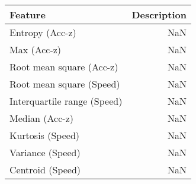 \begin{table}
\centering
\label{table:reg_fs}
\begin{tabular}{lr}
\toprule
           \textbf{Feature} & \textbf{Description} \\
\midrule
            Entropy (Acc-z) &                  NaN \\
                Max (Acc-z) &                  NaN \\
   Root mean square (Acc-z) &                  NaN \\
   Root mean square (Speed) &                  NaN \\
Interquartile range (Speed) &                  NaN \\
             Median (Acc-z) &                  NaN \\
           Kurtosis (Speed) &                  NaN \\
           Variance (Speed) &                  NaN \\
           Centroid (Speed) &                  NaN \\
\bottomrule
\end{tabular}
\end{table}

